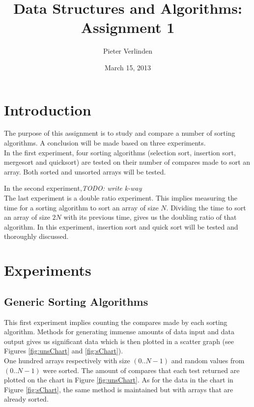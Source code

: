 \documentclass[pdftex,11pt,a4paper,english,titlepage]{article}
\author{Pieter Verlinden}
\title{Data Structures and Algorithms: Assignment 1}
\date{March 15, 2013}
\begin{document}

\tableofcontents
\newpage
\section{Introduction}
The purpose of this assignment is to study and compare a number of sorting algorithms. A conclusion will be made based on three experiments.\\

In the first experiment, four sorting algorithms (selection sort, insertion sort, mergesort and quicksort) are tested on their number of compares made to sort an array. Both sorted and unsorted arrays will be tested.

In the second experiment,\textit{{\color{red}TODO: write k-way}}\\
	
The last experiment is a double ratio experiment. This implies measuring the time for a sorting algorithm to sort an array of size $N$. Dividing the time to sort an array of size $2N$ with its previous time, gives us the doubling ratio of that algorithm.
In this experiment, insertion sort and quick sort will be tested and thoroughly discussed.
\section{Experiments}
		
	\subsection{Generic Sorting Algorithms}
This first experiment implies counting the compares made by each sorting algorithm. Methods for generating immense amounts of data input and data output gives us significant data which is then plotted in a scatter graph (see Figures \ref{fig:unsChart} and \ref{fig:sChart}).\\

One hundred arrays respectively with size $(0..N-1)$ and random values from $(0..N-1)$ were sorted. The amount of compares that each test returned are plotted on the chart in Figure \ref{fig:unsChart}.
As for the data in the chart in Figure \ref{fig:sChart}, the same method is maintained but with arrays that are already sorted.\\
\end{document}

